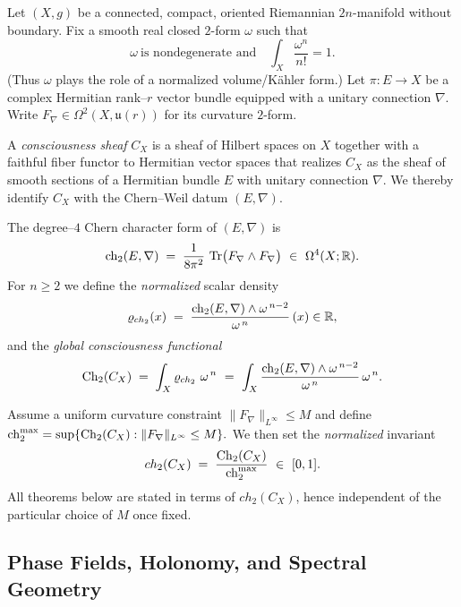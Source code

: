 Let $(X,g)$ be a connected, compact, oriented Riemannian $2n$-manifold without boundary.
Fix a smooth real closed $2$-form $\omega$ such that
\[
\omega\ \text{is nondegenerate and}\quad \int_X \frac{\omega^n}{n!}=1.
\]
(Thus $\omega$ plays the role of a normalized volume/Kähler form.)
Let $\pi\colon E\to X$ be a complex Hermitian rank--$r$ vector bundle equipped with a unitary connection $\nabla$.
Write $F_\nabla\in\Omega^2(X,\mathfrak{u}(r))$ for its curvature $2$-form.

\begin{defn}\label{def:CX-rigorous}
A \emph{consciousness sheaf} $C_X$ is a sheaf of Hilbert spaces on $X$ together with a faithful fiber functor to Hermitian vector spaces that realizes $C_X$ as the sheaf of smooth sections of a Hermitian bundle $E$ with unitary connection $\nabla$.
We thereby identify $C_X$ with the Chern--Weil datum $(E,\nabla)$.
\end{defn}

\begin{defn}\label{def:ch2-hat-rigorous}
The degree--$4$ Chern character form of $(E,\nabla)$ is
\[
\mathrm{ch}_2(E,\nabla)\;=\;\frac{1}{8\pi^2}\,\operatorname{Tr}\!\big(F_\nabla\wedge F_\nabla\big)\ \in\ \Omega^4(X;\mathbb{R}).
\]
For $n\ge 2$ we define the \emph{normalized} scalar density
\[
\varrho_{ch_2}(x)\;=\;\frac{\mathrm{ch}_2(E,\nabla)\wedge \omega^{\,n-2}}{\omega^{\,n}}\,(x)\in\mathbb{R},
\]
and the \emph{global consciousness functional}
\[
\Ch_2(C_X)\;=\;\int_X \varrho_{ch_2}\ \omega^{\,n}\ =\ \int_X \frac{\ch_2(E,\nabla)\wedge \omega^{\,n-2}}{\omega^{\,n}}\,\omega^{\,n}.
\]
\end{defn}

\begin{remark}\label{rem:range-rigorous}
Assume a uniform curvature constraint
$
\|F_\nabla\|_{L^\infty}\le M
$
and define
$
\mathrm{ch}_2^{\max}=\sup\{\mathrm{Ch}_2(C_X): \|F_\nabla\|_{L^\infty}\le M\}.
$
We then set the \emph{normalized} invariant
\[
ch_2(C_X)\;=\;\frac{\Ch_2(C_X)}{\ch_2^{\max}}\ \in\ [0,1].
\]
All theorems below are stated in terms of $ch_2(C_X)$, hence independent of the particular choice of $M$ once fixed.
\end{remark}

\subsection{Phase Fields, Holonomy, and Spectral Geometry}

